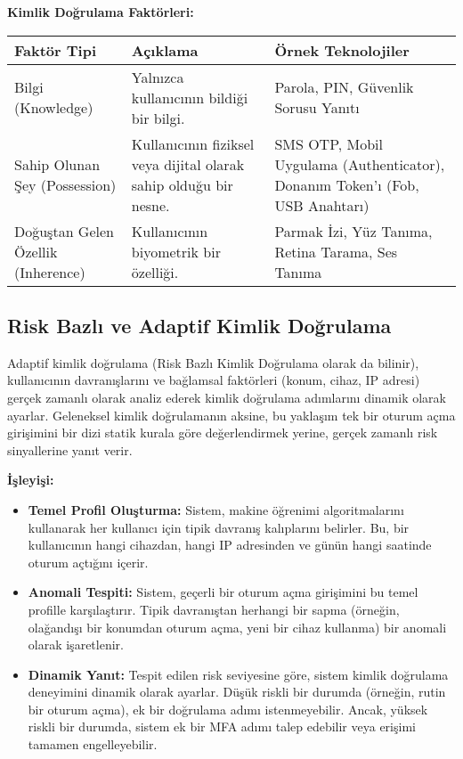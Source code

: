 \textbf{Kimlik Doğrulama Faktörleri:}
\begin{tabularx}{\textwidth}{|l|X|X|}
\hline
\textbf{Faktör Tipi} & \textbf{Açıklama} & \textbf{Örnek Teknolojiler} \\
\hline
Bilgi (Knowledge) & Yalnızca kullanıcının bildiği bir bilgi. & Parola, PIN, Güvenlik Sorusu Yanıtı \\
\hline
Sahip Olunan Şey (Possession) & Kullanıcının fiziksel veya dijital olarak sahip olduğu bir nesne. & SMS OTP, Mobil Uygulama (Authenticator), Donanım Token'ı (Fob, USB Anahtarı) \\
\hline
Doğuştan Gelen Özellik (Inherence) & Kullanıcının biyometrik bir özelliği. & Parmak İzi, Yüz Tanıma, Retina Tarama, Ses Tanıma \\
\hline
\end{tabularx}

\subsection{Risk Bazlı ve Adaptif Kimlik Doğrulama}

Adaptif kimlik doğrulama (Risk Bazlı Kimlik Doğrulama olarak da bilinir), kullanıcının davranışlarını ve bağlamsal faktörleri (konum, cihaz, IP adresi) gerçek zamanlı olarak analiz ederek kimlik doğrulama adımlarını dinamik olarak ayarlar. Geleneksel kimlik doğrulamanın aksine, bu yaklaşım tek bir oturum açma girişimini bir dizi statik kurala göre değerlendirmek yerine, gerçek zamanlı risk sinyallerine yanıt verir.

\textbf{İşleyişi:}
\begin{itemize}
    \item \textbf{Temel Profil Oluşturma:} Sistem, makine öğrenimi algoritmalarını kullanarak her kullanıcı için tipik davranış kalıplarını belirler. Bu, bir kullanıcının hangi cihazdan, hangi IP adresinden ve günün hangi saatinde oturum açtığını içerir.
    \item \textbf{Anomali Tespiti:} Sistem, geçerli bir oturum açma girişimini bu temel profille karşılaştırır. Tipik davranıştan herhangi bir sapma (örneğin, olağandışı bir konumdan oturum açma, yeni bir cihaz kullanma) bir anomali olarak işaretlenir.
    \item \textbf{Dinamik Yanıt:} Tespit edilen risk seviyesine göre, sistem kimlik doğrulama deneyimini dinamik olarak ayarlar. Düşük riskli bir durumda (örneğin, rutin bir oturum açma), ek bir doğrulama adımı istenmeyebilir. Ancak, yüksek riskli bir durumda, sistem ek bir MFA adımı talep edebilir veya erişimi tamamen engelleyebilir.
\end{itemize}

